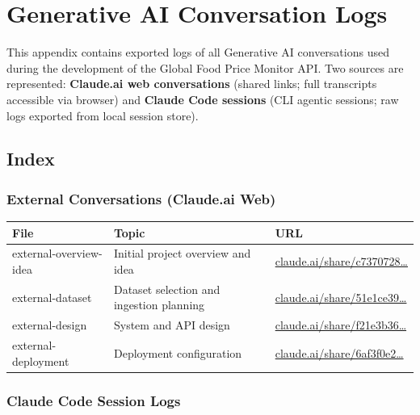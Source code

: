 \section{Generative AI Conversation Logs}
\label{app:genai}

This appendix contains exported logs of all Generative AI conversations used during
the development of the Global Food Price Monitor API.
Two sources are represented: \textbf{Claude.ai web conversations} (shared links;
full transcripts accessible via browser) and \textbf{Claude Code sessions} (CLI
agentic sessions; raw logs exported from local session store).

\subsection{Index}

\subsubsection*{External Conversations (Claude.ai Web)}

\begin{tabular}{lll}
\toprule
\textbf{File} & \textbf{Topic} & \textbf{URL} \\
\midrule
external-overview-idea & Initial project overview and idea &
    \href{https://claude.ai/share/c7370728-7d81-42d8-8041-56501efca1b2}{claude.ai/share/c7370728\ldots} \\
external-dataset & Dataset selection and ingestion planning &
    \href{https://claude.ai/share/51e1ce39-726b-4ad3-ba2a-003814e54336}{claude.ai/share/51e1ce39\ldots} \\
external-design & System and API design &
    \href{https://claude.ai/share/f21e3b36-9194-4388-95a5-ab973bbde60a}{claude.ai/share/f21e3b36\ldots} \\
external-deployment & Deployment configuration &
    \href{https://claude.ai/share/6af3f0e2-cd9b-4eaa-a159-d3cc85965720}{claude.ai/share/6af3f0e2\ldots} \\
\bottomrule
\end{tabular}

\subsubsection*{Claude Code Session Logs}

